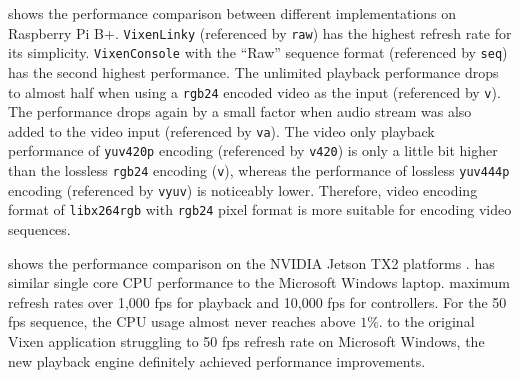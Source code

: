  shows the performance comparison between different implementations on Raspberry Pi B+. \texttt{VixenLinky} (referenced by \texttt{raw}) has the highest refresh rate for its simplicity. \texttt{VixenConsole} with the ``Raw'' sequence format (referenced by \texttt{seq}) has the second highest performance. The unlimited playback performance drops to almost half when using a \texttt{rgb24} encoded video as the input (referenced by \texttt{v}). The performance drops again by a small factor when audio stream was also added to the video input (referenced by \texttt{va}). The video only playback performance of \texttt{yuv420p} encoding (referenced by \texttt{v420}) is only a little bit higher than the lossless \texttt{rgb24} encoding (\texttt{v}), whereas the performance of lossless \texttt{yuv444p} encoding (referenced by \texttt{vyuv}) is noticeably lower. Therefore, video encoding format of \texttt{libx264rgb} with \texttt{rgb24} pixel format is more suitable for encoding video sequences.

  shows the performance comparison on  the NVIDIA Jetson TX2 platforms .  has  similar single core CPU performance to the Microsoft Windows laptop.  maximum refresh rates  over 1,000 fps for playback and 10,000 fps for controllers. For the 50 fps  sequence, the CPU usage almost never reaches above $1 \%$.  to the original Vixen application struggling to  50 fps refresh rate on Microsoft Windows, the new playback engine definitely achieved  performance improvements.

